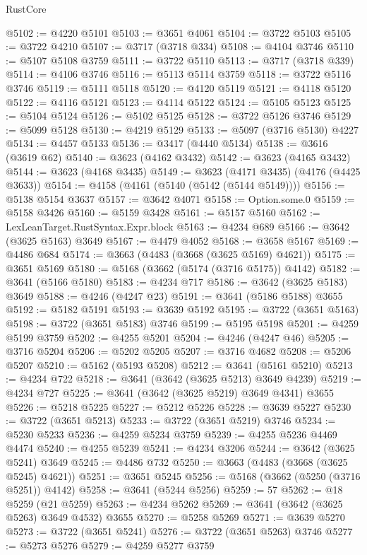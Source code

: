 \begin{lexlean}{RustCore}
\begin{coremodule}
@5102 := @4220 @5101
@5103 := @3651 @4061
@5104 := @3722 @5103
@5105 := @3722 @4210
@5107 := @3717 (@3718 @334)
@5108 := @4104 @3746
@5110 := @5107 @5108 @3759
@5111 := @3722 @5110
@5113 := @3717 (@3718 @339)
@5114 := @4106 @3746
@5116 := @5113 @5114 @3759
@5118 := @3722 @5116 @3746
@5119 := @5111 @5118
@5120 := @4120 @5119
@5121 := @4118 @5120
@5122 := @4116 @5121
@5123 := @4114 @5122
@5124 := @5105 @5123
@5125 := @5104 @5124
@5126 := @5102 @5125
@5128 := @3722 @5126 @3746
@5129 := @5099 @5128
@5130 := @4219 @5129
@5133 := @5097 (@3716 @5130) @4227
@5134 := @4457 @5133
@5136 := @3417 (@4440 @5134)
@5138 := @3616 (@3619 @62)
@5140 := @3623 (@4162 @3432)
@5142 := @3623 (@4165 @3432)
@5144 := @3623 (@4168 @3435)
@5149 := @3623 (@4171 @3435) (@4176 (@4425 @3633))
@5154 := @4158 (@4161 (@5140 (@5142 (@5144 @5149))))
@5156 := @5138 @5154 @3637
@5157 := @3642 @4071
@5158 := Option.some.{0}
@5159 := @5158 @3426
@5160 := @5159 @3428
@5161 := @5157 @5160
@5162 := LexLeanTarget.RustSyntax.Expr.block
@5163 := @4234 @689
@5166 := @3642 (@3625 @5163) @3649
@5167 := @4479 @4052
@5168 := @3658 @5167
@5169 := @4486 @684
@5174 := @3663 (@4483 (@3668 (@3625 @5169) @4621))
@5175 := @3651 @5169
@5180 := @5168 (@3662 (@5174 (@3716 @5175)) @4142)
@5182 := @3641 (@5166 @5180)
@5183 := @4234 @717
@5186 := @3642 (@3625 @5183) @3649
@5188 := @4246 (@4247 @23)
@5191 := @3641 (@5186 @5188) @3655
@5192 := @5182 @5191
@5193 := @3639 @5192
@5195 := @3722 (@3651 @5163)
@5198 := @3722 (@3651 @5183) @3746
@5199 := @5195 @5198
@5201 := @4259 @5199 @3759
@5202 := @4255 @5201
@5204 := @4246 (@4247 @46)
@5205 := @3716 @5204
@5206 := @5202 @5205
@5207 := @3716 @4682
@5208 := @5206 @5207
@5210 := @5162 (@5193 @5208)
@5212 := @3641 (@5161 @5210)
@5213 := @4234 @722
@5218 := @3641 (@3642 (@3625 @5213) @3649 @4239)
@5219 := @4234 @727
@5225 := @3641 (@3642 (@3625 @5219) @3649 @4341) @3655
@5226 := @5218 @5225
@5227 := @5212 @5226
@5228 := @3639 @5227
@5230 := @3722 (@3651 @5213)
@5233 := @3722 (@3651 @5219) @3746
@5234 := @5230 @5233
@5236 := @4259 @5234 @3759
@5239 := @4255 @5236 @4469 @4474
@5240 := @4255 @5239
@5241 := @4234 @3206
@5244 := @3642 (@3625 @5241) @3649
@5245 := @4486 @732
@5250 := @3663 (@4483 (@3668 (@3625 @5245) @4621))
@5251 := @3651 @5245
@5256 := @5168 (@3662 (@5250 (@3716 @5251)) @4142)
@5258 := @3641 (@5244 @5256)
@5259 := 57
@5262 := @18 @5259 (@21 @5259)
@5263 := @4234 @5262
@5269 := @3641 (@3642 (@3625 @5263) @3649 @4532) @3655
@5270 := @5258 @5269
@5271 := @3639 @5270
@5273 := @3722 (@3651 @5241)
@5276 := @3722 (@3651 @5263) @3746
@5277 := @5273 @5276
@5279 := @4259 @5277 @3759

\end{coremodule}
\end{lexlean}
